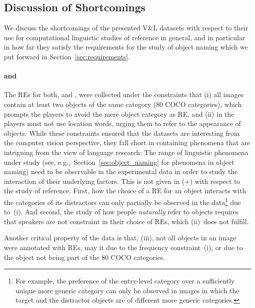 {\subsection{Discussion of Shortcomings}
We discuss the shortcomings of the presented V\&L datasets with respect to their use for computational linguistic studies of reference in general, and in particular in how far they satisfy the requirements for the study of object naming which we put forward in  Section~\ref{sec:requirements}. 

\paragraph{ and }
The REs for both,  and , were collected under the constraints that (i) all images contain at least two objects of the same category (80 COCO categories), which prompts the players to avoid the mere object category as RE, and (ii) in  the players must not use location words, urging them to refer to the appearance of objects. 
%
While these constraints ensured that the datasets are interesting from the computer vision perspective, they fall short in containing phenomena that are intriguing from the view of language research: 
%
The range of linguistic phenomena under study (see, e.g.,~Section~\ref{sec:object_naming} for phenomena in object naming) need to be observable in the experimental data in order to study the interaction of their underlying factors. 
This is not given in (+) with respect to the study of reference. 
First, how the choice of a RE for an object interacts with the categories of its distractors can only partially be observed in the data\footnote{For example, the preference of the entry-level category over a sufficiently unique more generic category can only be observed in images in which the target and the distractor objects are of different more generic categories.} due to~(i). 
And second, the study of how people \textit{naturally} refer to objects requires that speakers are not constraint in their choice of REs, which (ii)~does not fulfill.

Another critical property of the data is that, (iii), not all objects in an image were annotated with REs, may it due to the frequency constraint~(i), or due to the object not being part of the 80 COCO categories. 


}
